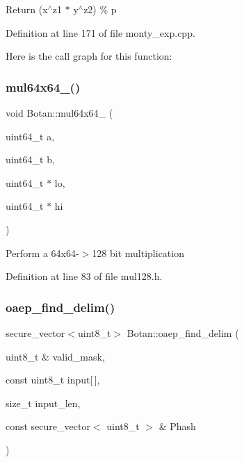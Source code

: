 Return (x$^\wedge$z1 $\ast$ y$^\wedge$z2) \% p 

Definition at line 171 of file monty\+\_\+exp.\+cpp.

Here is the call graph for this function\+:
\mbox{\label{namespace_botan_ad0da4682632518b5b7b11848dc3025e3}} 
\subsubsection{\texorpdfstring{mul64x64\+\_()}{mul64x64\_128()}}
{\footnotesize\ttfamily void Botan\+::mul64x64\+\_ (\begin{DoxyParamCaption}\item[{uint64\+\_\+t}]{a,  }\item[{uint64\+\_\+t}]{b,  }\item[{uint64\+\_\+t $\ast$}]{lo,  }\item[{uint64\+\_\+t $\ast$}]{hi }\end{DoxyParamCaption})\hspace{0.3cm}{\ttfamily [inline]}}

Perform a 64x64-\/$>$128 bit multiplication 

Definition at line 83 of file mul128.\+h.

\mbox{\label{namespace_botan_a3778103665c2cb22e4f311002755cd53}} 
\subsubsection{\texorpdfstring{oaep\+\_\+find\+\_\+delim()}{oaep\_find\_delim()}}
{\footnotesize\ttfamily secure\+\_\+vector$<$uint8\+\_\+t$>$ Botan\+::oaep\+\_\+find\+\_\+delim (\begin{DoxyParamCaption}\item[{uint8\+\_\+t \&}]{valid\+\_\+mask,  }\item[{const uint8\+\_\+t}]{input\mbox{[}$\,$\mbox{]},  }\item[{size\+\_\+t}]{input\+\_\+len,  }\item[{const secure\+\_\+vector$<$ uint8\+\_\+t $>$ \&}]{Phash }\end{DoxyParamCaption})}

